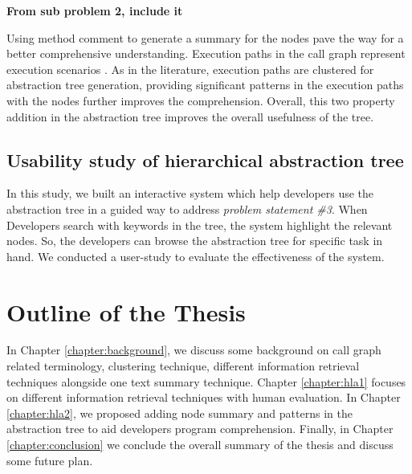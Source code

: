  \textbf{From sub problem 2, include it}
 
 
 Using method comment to generate a summary for the nodes  pave the way for a better comprehensive understanding. Execution paths in the call graph represent execution scenarios \cite{salah2005scenariographer,pradel2009automatic}. As in the literature, execution paths are clustered for abstraction tree generation, providing significant patterns in the execution paths with the nodes further improves the comprehension. Overall, this two property addition in the abstraction tree improves the overall usefulness of the tree. 

\subsection{Usability study of hierarchical abstraction tree}

In this study, we built an interactive system which help developers use the abstraction tree in a guided way to address \emph{problem statement \#3}. When Developers search with keywords in the tree, the system highlight the relevant nodes. So, the developers can browse the abstraction tree for specific task in hand. We conducted a user-study to evaluate the effectiveness of the system. 


\section{Outline of the Thesis}
In Chapter \ref{chapter:background}, we discuss some background on call graph related terminology, clustering technique, different information retrieval techniques alongside one text summary technique. Chapter \ref{chapter:hla1} focuses on different information retrieval techniques with human evaluation. In Chapter \ref{chapter:hla2}, we proposed adding node summary and patterns in the abstraction tree to aid developers program comprehension. Finally, in Chapter \ref{chapter:conclusion} we conclude the overall summary of the thesis and discuss some future plan. 

